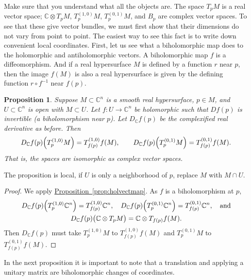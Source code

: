 \documentclass[12pt,openany]{book}
\newcommand{\avoidbreak}{\postdisplaypenalty=100}
\newcommand{\C}{{\mathbb{C}}}
\theoremstyle{plain}
\newtheorem{prop}[thm]{Proposition}
\theoremstyle{remark}
\theoremstyle{definition}
\theoremstyle{exercise}
\theoremstyle{example}
\newcommand{\propref}[1]{\hyperref[#1]{Proposition~\ref*{#1}}}
\begin{document}
Make sure that you understand what all the objects are.  The space
$T_pM$ is a real vector space; $\C \otimes T_pM$, $T_p^{(1,0)}M$,
$T_p^{(0,1)} M$, and $B_p$ are complex vector spaces.  To see that
these give vector bundles,
we must first show that their dimensions do not vary
from point to point.  The easiest way to see this fact is to write down
convenient local coordinates.  First, let us see what a biholomorphic map
does to the holomorphic and antiholomorphic vectors.  A biholomorphic map
$f$ is a diffeomorphism.  And if a real hypersurface $M$ is defined
by a function $r$ near $p$, then the image $f(M)$ is also
a real hypersurface is given by the defining function
$r \circ f^{-1}$ near $f(p)$.


\begin{prop}
Suppose $M \subset \C^n$ is a smooth real hypersurface, $p \in M$,
and $U \subset \C^n$ is open with $M \subset U$.
Let $f \colon U \to \C^n$ be holomorphic such
that $D f(p)$ is invertible (a biholomorphism near $p$).  Let $D_\C f(p)$ be
the complexified real derivative as before.  Then
\begin{equation*}
D_\C f(p)\Bigl(T_p^{(1,0)}M\Bigr) = T_{f(p)}^{(1,0)}f(M), \qquad
D_\C f(p)\Bigl(T_p^{(0,1)}M\Bigr) = T_{f(p)}^{(0,1)}f(M).
\end{equation*}
That is, the spaces are isomorphic as complex vector spaces.
\end{prop}

The proposition is local, if $U$ is only a neighborhood of $p$,
replace $M$ with $M \cap U$.

\begin{proof}
We apply \propref{prop:holvectmap}.
As $f$ is a biholomorphism at $p$,
\begin{multline*}
D_\C f(p)\Bigl(T_p^{(1,0)}\C^n\Bigr) = T_{f(p)}^{(1,0)}\C^n, \quad
D_\C f(p)\Bigl(T_p^{(0,1)}\C^n\Bigr) = T_{f(p)}^{(0,1)}\C^n, \quad
\text{and} \\
D_\C f(p)\bigl(\C \otimes T_pM\bigr) =\C \otimes  T_{f(p)}f(M) .
\avoidbreak
\end{multline*}
Then $D_\C f(p)$ must take
$T_p^{(1,0)}M$ to $T_{f(p)}^{(1,0)}f(M)$ and
$T_p^{(0,1)}M$ to $T_{f(p)}^{(0,1)}f(M)$.
\end{proof}

In the next proposition it is important to note that a translation and
applying a unitary matrix are biholomorphic changes of coordinates.
\end{document}
